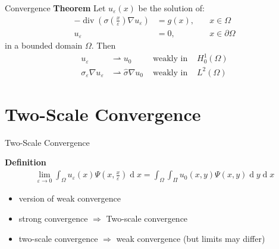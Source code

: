 \documentclass[10pt]{beamer}	%
\begin{document}
\begin{frame}{Convergence}
\textbf{Theorem}
Let 
$u_\varepsilon(x)$ be the solution of:
\begin{align*}
-\operatorname{div} (\sigma(\frac{x}{\varepsilon}) \nabla u_{\varepsilon}) &= g(x) , \quad & x \in \Omega\\
u_{\varepsilon} &= 0, \quad &x \in \partial \Omega
\end{align*}
in a bounded domain $\Omega$. Then 
\begin{align*}
u_{\varepsilon} &\rightharpoonup u_0 &\text{ weakly in } &H^1_0(\Omega)\\
\sigma_{\varepsilon}\nabla u_{\varepsilon} &\rightharpoonup \hat \sigma \nabla u_0 &\text{ weakly in } &L^2(\Omega)
\end{align*}
\end{frame}


%

%
\section{Two-Scale Convergence}
\begin{frame}{Two-Scale Convergence}

\textbf{Definition}
\begin{align*}
\lim_{\varepsilon \to 0} \int_
{\Omega} u_\varepsilon (x) \Psi(x,\frac{x}{\varepsilon}) \operatorname d x = \int_{\Omega} \int_\Pi u_0(x,y) \Psi(x,y)\operatorname d y \operatorname d x
\end{align*}

\begin{itemize}
\item version of weak convergence
\item strong convergence $\Rightarrow$ Two-scale convergence
\item two-scale convergence $\Rightarrow$ weak convergence (but limits may differ)
\end{itemize}
\end{frame}




%
\end{document}
